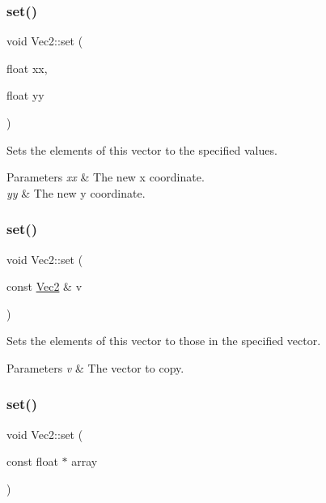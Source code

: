 \subsubsection{\texorpdfstring{set()}{set()}\hspace{0.1cm}{\footnotesize\ttfamily [3/8]}}
{\footnotesize\ttfamily void Vec2\+::set (\begin{DoxyParamCaption}\item[{float}]{xx,  }\item[{float}]{yy }\end{DoxyParamCaption})\hspace{0.3cm}{\ttfamily [inline]}}

Sets the elements of this vector to the specified values.


\begin{DoxyParams}{Parameters}
{\em xx} & The new x coordinate. \\
\hline
{\em yy} & The new y coordinate. \\
\hline
\end{DoxyParams}
\mbox{\label{classVec2_a2c4e29e470c177b19c8f2ccaee8d6185}} 
\subsubsection{\texorpdfstring{set()}{set()}\hspace{0.1cm}{\footnotesize\ttfamily [4/8]}}
{\footnotesize\ttfamily void Vec2\+::set (\begin{DoxyParamCaption}\item[{const \hyperlink{classVec2}{Vec2} \&}]{v }\end{DoxyParamCaption})\hspace{0.3cm}{\ttfamily [inline]}}

Sets the elements of this vector to those in the specified vector.


\begin{DoxyParams}{Parameters}
{\em v} & The vector to copy. \\
\hline
\end{DoxyParams}
\mbox{\label{classVec2_a492bf35fe6975aebe475519f21d86364}} 
\subsubsection{\texorpdfstring{set()}{set()}\hspace{0.1cm}{\footnotesize\ttfamily [5/8]}}
{\footnotesize\ttfamily void Vec2\+::set (\begin{DoxyParamCaption}\item[{const float $\ast$}]{array }\end{DoxyParamCaption})}


